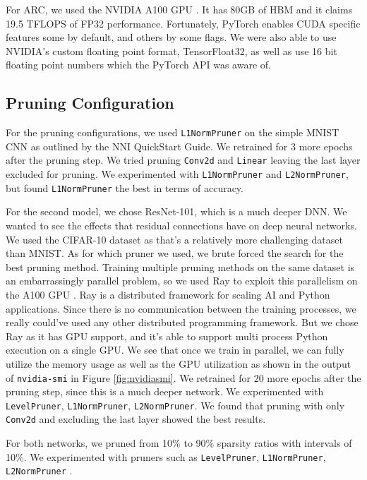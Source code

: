 \documentclass{article}
\begin{document}
For ARC, we used the NVIDIA A100 GPU \cite{a100}. It has 80GB of HBM and it claims 19.5 TFLOPS of FP32 performance. Fortunately, PyTorch enables CUDA specific features some by default, and others by some flags. We were also able to use NVIDIA's custom floating point format, TensorFloat32, as well as use 16 bit floating point numbers which the PyTorch API was aware of.


\subsection{Pruning Configuration}
For the pruning configurations, we used \verb|L1NormPruner| on the simple MNIST CNN as outlined by the NNI QuickStart Guide. We retrained for 3 more epochs after the pruning step. We tried pruning \verb|Conv2d| and \verb|Linear| leaving the last layer excluded for pruning. We experimented with \verb|L1NormPruner| and \verb|L2NormPruner|, but found \verb|L1NormPruner| the best in terms of accuracy.

For the second model, we chose ResNet-101, which is a much deeper DNN. We wanted to see the effects that residual connections have on deep neural networks. We used the CIFAR-10 dataset as that's a relatively more challenging dataset than MNIST. As for which pruner we used, we brute forced the search for the best pruning method. Training multiple pruning methods on the same dataset is an embarrassingly parallel problem, so we used Ray to exploit this parallelism on the A100 GPU \cite{ray}. Ray is a distributed framework for scaling AI and Python applications. Since there is no communication between the training processes, we really could've used any other distributed programming framework. But we chose Ray as it has GPU support, and it's able to support multi process Python execution on a single GPU. We see that once we train in parallel, we can fully utilize the memory usage as well as the GPU utilization as shown in the output of \verb|nvidia-smi| in Figure \ref{fig:nvidiasmi}. We retrained for 20 more epochs after the pruning step, since this is a much deeper network. We experimented with \verb|LevelPruner|, \verb|L1NormPruner|, \verb|L2NormPruner|. We found that pruning with only \verb|Conv2d| and excluding the last layer showed the best results.

For both networks, we pruned from 10\% to 90\% sparsity ratios with intervals of 10\%. We experimented with pruners such as \verb|LevelPruner|, \verb|L1NormPruner|, \verb|L2NormPruner| \cite{levelpruner, l1prune}.
\end{document}
